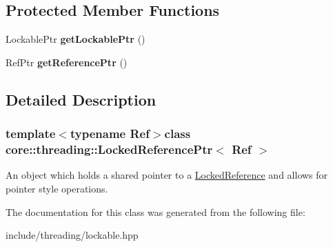 \subsection*{Protected Member Functions}
\begin{DoxyCompactItemize}
\item 
\hypertarget{classcore_1_1threading_1_1_locked_reference_ptr_a98c914badb27d6bb30cf0e08b3d2dd1a}{Lockable\-Ptr {\bfseries get\-Lockable\-Ptr} ()}\label{classcore_1_1threading_1_1_locked_reference_ptr_a98c914badb27d6bb30cf0e08b3d2dd1a}

\item 
\hypertarget{classcore_1_1threading_1_1_locked_reference_ptr_aeb8cd0b1d8a8a88aed482d65eafa66ec}{Ref\-Ptr {\bfseries get\-Reference\-Ptr} ()}\label{classcore_1_1threading_1_1_locked_reference_ptr_aeb8cd0b1d8a8a88aed482d65eafa66ec}

\end{DoxyCompactItemize}


\subsection{Detailed Description}
\subsubsection*{template$<$typename Ref$>$class core\-::threading\-::\-Locked\-Reference\-Ptr$<$ Ref $>$}

An object which holds a shared pointer to a \hyperlink{classcore_1_1threading_1_1_locked_reference}{Locked\-Reference} and allows for pointer style operations. 

The documentation for this class was generated from the following file\-:\begin{DoxyCompactItemize}
\item 
include/threading/lockable.\-hpp\end{DoxyCompactItemize}
